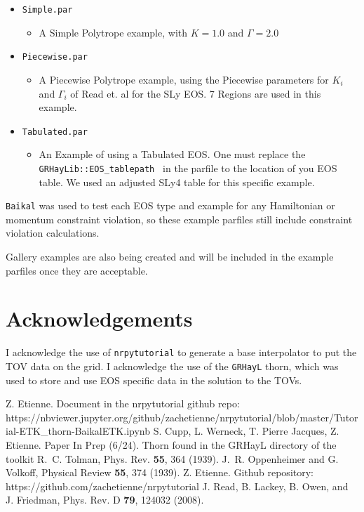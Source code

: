 \begin{itemize}
    \item \texttt{Simple.par }
    \begin{itemize}
    \item A Simple Polytrope example, with $K=1.0$ and $\Gamma=2.0$
    \end{itemize}
    \item \texttt{Piecewise.par }
    \begin{itemize}
    \item A Piecewise Polytrope example, using the Piecewise parameters for $K_i$ and $\Gamma_i$ of Read et. al for the SLy EOS.\cite{TOVola_TOVola_Read} 7 Regions are used in this example.
    \end{itemize}
    \item \texttt{Tabulated.par }
    \begin{itemize}
	    \item An Example of using a Tabulated EOS. One must replace the \texttt{GRHayLib::EOS\_tablepath } in the parfile to the location of you EOS table. We used an adjusted SLy4 table for this specific example.
    \end{itemize}
\end{itemize}

\texttt{Baikal} was used to test each EOS type and example for any Hamiltonian or momentum constraint violation, so these example parfiles still include constraint violation calculations.

Gallery examples are also being created and will be included in the example parfiles once they are acceptable.

\section{Acknowledgements}

I acknowledge the use of \texttt{nrpytutorial}\cite{TOVola_TOVola_NRpy} to generate a base interpolator to put the TOV data on the grid. I acknowledge the use of the \texttt{GRHayL} thorn, which was used to store and use EOS specific data in the solution to the TOVs.

\begin{thebibliography}{9}
Z. Etienne. Document in the nrpytutorial github repo: https://nbviewer.jupyter.org/github/zachetienne/nrpytutorial/blob/master/Tutorial-ETK\_thorn-BaikalETK.ipynb
%
S. Cupp, L. Werneck, T. Pierre Jacques, Z. Etienne. Paper In Prep (6/24). Thorn found in the GRHayL directory of the toolkit
%
R.~C. Tolman, Phys. Rev. {\bf 55}, 364 (1939).
%
J.~R. Oppenheimer and G. Volkoff, Physical Review {\bf 55}, 374 (1939).
%
Z. Etienne. Github repository: https://github.com/zachetienne/nrpytutorial
%
J. Read, B. Lackey, B. Owen, and J. Friedman, Phys. Rev. D {\bf 79}, 124032 (2008).
%
\end{thebibliography}



